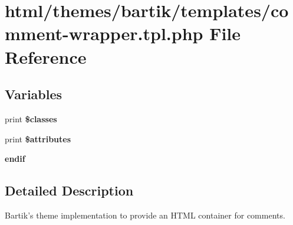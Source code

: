 \hypertarget{themes_2bartik_2templates_2comment-wrapper_8tpl_8php}{
\section{html/themes/bartik/templates/comment-\/wrapper.tpl.php File Reference}
\label{themes_2bartik_2templates_2comment-wrapper_8tpl_8php}
}
\subsection*{Variables}
\begin{DoxyCompactItemize}
\item 
\hypertarget{themes_2bartik_2templates_2comment-wrapper_8tpl_8php_a6d48ecbdbc70ca1812e665169b5fa1e2}{
print {\bfseries \$classes}}
\label{themes_2bartik_2templates_2comment-wrapper_8tpl_8php_a6d48ecbdbc70ca1812e665169b5fa1e2}

\item 
\hypertarget{themes_2bartik_2templates_2comment-wrapper_8tpl_8php_a9c88c4272fa40546577b45392a0b3cd3}{
print {\bfseries \$attributes}}
\label{themes_2bartik_2templates_2comment-wrapper_8tpl_8php_a9c88c4272fa40546577b45392a0b3cd3}

\item 
\hypertarget{themes_2bartik_2templates_2comment-wrapper_8tpl_8php_a82cd33ca97ff99f2fcc5e9c81d65251b}{
{\bfseries endif}}
\label{themes_2bartik_2templates_2comment-wrapper_8tpl_8php_a82cd33ca97ff99f2fcc5e9c81d65251b}

\end{DoxyCompactItemize}


\subsection{Detailed Description}
Bartik's theme implementation to provide an HTML container for comments.

